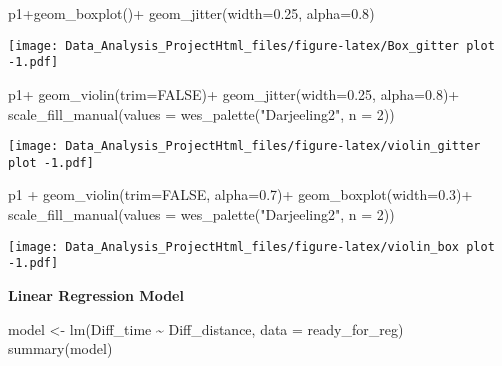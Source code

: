 \documentclass[
]{article}
\newenvironment{Shaded}{\begin{snugshade}}{\end{snugshade}}
\newcommand{\AttributeTok}[1]{\textcolor[rgb]{0.77,0.63,0.00}{#1}}
\newcommand{\ConstantTok}[1]{\textcolor[rgb]{0.00,0.00,0.00}{#1}}
\newcommand{\DecValTok}[1]{\textcolor[rgb]{0.00,0.00,0.81}{#1}}
\newcommand{\FloatTok}[1]{\textcolor[rgb]{0.00,0.00,0.81}{#1}}
\newcommand{\FunctionTok}[1]{\textcolor[rgb]{0.00,0.00,0.00}{#1}}
\newcommand{\NormalTok}[1]{#1}
\newcommand{\OtherTok}[1]{\textcolor[rgb]{0.56,0.35,0.01}{#1}}
\newcommand{\SpecialCharTok}[1]{\textcolor[rgb]{0.00,0.00,0.00}{#1}}
\newcommand{\StringTok}[1]{\textcolor[rgb]{0.31,0.60,0.02}{#1}}
\begin{document}
\begin{Shaded}
\begin{Highlighting}[]
\NormalTok{p1}\SpecialCharTok{+}\FunctionTok{geom\_boxplot}\NormalTok{()}\SpecialCharTok{+}
\FunctionTok{geom\_jitter}\NormalTok{(}\AttributeTok{width=}\FloatTok{0.25}\NormalTok{, }\AttributeTok{alpha=}\FloatTok{0.8}\NormalTok{)}
\end{Highlighting}
\end{Shaded}

\texttt{[image: Data\_Analysis\_ProjectHtml\_files/figure-latex/Box\_gitter plot -1.pdf]}

\begin{Shaded}
\begin{Highlighting}[]
\NormalTok{p1}\SpecialCharTok{+}
  \FunctionTok{geom\_violin}\NormalTok{(}\AttributeTok{trim=}\ConstantTok{FALSE}\NormalTok{)}\SpecialCharTok{+}
  \FunctionTok{geom\_jitter}\NormalTok{(}\AttributeTok{width=}\FloatTok{0.25}\NormalTok{, }\AttributeTok{alpha=}\FloatTok{0.8}\NormalTok{)}\SpecialCharTok{+}
  \FunctionTok{scale\_fill\_manual}\NormalTok{(}\AttributeTok{values =} \FunctionTok{wes\_palette}\NormalTok{(}\StringTok{"Darjeeling2"}\NormalTok{, }\AttributeTok{n =} \DecValTok{2}\NormalTok{))}
\end{Highlighting}
\end{Shaded}

\texttt{[image: Data\_Analysis\_ProjectHtml\_files/figure-latex/violin\_gitter plot -1.pdf]}

\begin{Shaded}
\begin{Highlighting}[]
\NormalTok{p1 }\SpecialCharTok{+}
  \FunctionTok{geom\_violin}\NormalTok{(}\AttributeTok{trim=}\ConstantTok{FALSE}\NormalTok{, }\AttributeTok{alpha=}\FloatTok{0.7}\NormalTok{)}\SpecialCharTok{+}
  \FunctionTok{geom\_boxplot}\NormalTok{(}\AttributeTok{width=}\FloatTok{0.3}\NormalTok{)}\SpecialCharTok{+}
  \FunctionTok{scale\_fill\_manual}\NormalTok{(}\AttributeTok{values =} \FunctionTok{wes\_palette}\NormalTok{(}\StringTok{"Darjeeling2"}\NormalTok{, }\AttributeTok{n =} \DecValTok{2}\NormalTok{))}
\end{Highlighting}
\end{Shaded}

\texttt{[image: Data\_Analysis\_ProjectHtml\_files/figure-latex/violin\_box plot -1.pdf]}

\textbf{Linear Regression Model}

\begin{Shaded}
\begin{Highlighting}[]
\NormalTok{model }\OtherTok{\textless{}{-}} \FunctionTok{lm}\NormalTok{(Diff\_time }\SpecialCharTok{\textasciitilde{}}\NormalTok{ Diff\_distance, }\AttributeTok{data =}\NormalTok{ ready\_for\_reg)}
\FunctionTok{summary}\NormalTok{(model)}
\end{Highlighting}
\end{Shaded}
\end{document}
